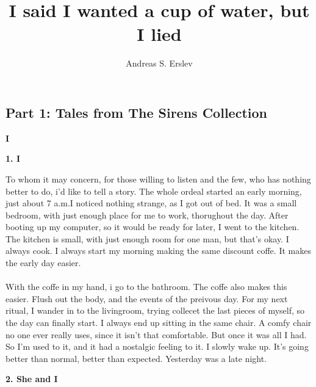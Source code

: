 \documentclass[]{article}
\title{I said I wanted a cup of water, but I lied}
\author{Andreas S. Erslev}
\begin{document}
\maketitle

\begin{center}
	\section{Part 1: Tales from The Sirens Collection}
\end{center}

\begin{center}
	\Large\textbf{I}
\end{center}

\begin{center}
	\large\textbf{1. I}
\end{center}

To whom it may concern, for those willing to listen and the few, who has nothing better to do, i'd like to tell a story. The whole ordeal started an early morning, just about 7 a.m.I noticed nothing strange, as I got out of bed. It was a small bedroom, with just enough place for me to work, thorughout the day. After booting up my computer, so it would be ready for later, I went to the kitchen. The kitchen is small, with just enough room for one man, but that's okay. I always cook. I always start my morning making the same discount coffe. It makes the early day easier. 
\\ \\
With the coffe in my hand, i go to the bathroom. The coffe also makes this easier. Flush out the body, and the events of the preivous day. For my next ritual, I wander in to the livingroom, trying collecet the last pieces of myself, so the day can finally start. I always end up sitting in the same chair. A comfy chair no one ever really uses, since it isn't that comfortable. But once it was all I had. So I'm used to it, and it had a nostalgic feeling to it. I slowly wake up. It's going better than normal, better than expected. Yesterday was a late night.

\begin{center}
	\large\textbf{2. She and I}
\end{center}
\end{document}

